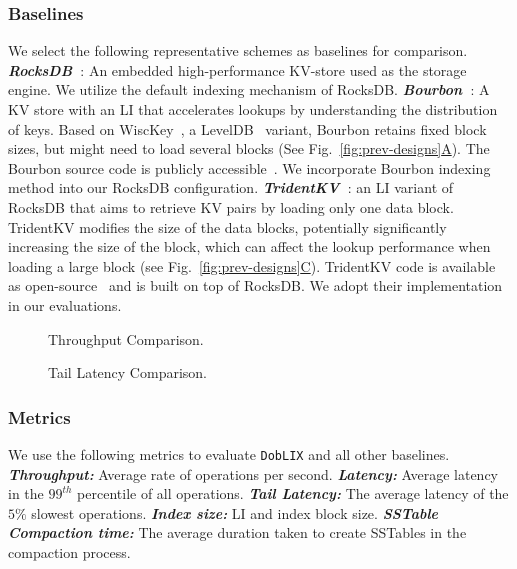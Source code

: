 \subsubsection{\textbf{Baselines}} We select the following representative schemes as baselines for comparison. \textbf{\textit{{RocksDB~\cite{rocksdbpaper}}}}: An embedded high-performance KV-store used as the storage engine. We utilize the default indexing mechanism of RocksDB.
\textbf{\textit{{Bourbon~\cite{Bourbon2020}}}}: A KV store with an LI that accelerates lookups by understanding the distribution of keys. Based on WiscKey~\cite{lu2017wisckey}, a LevelDB~\cite{leveldb} variant, Bourbon retains fixed block sizes, but might need to load several blocks (See Fig.~\hyperref[fig:prev-designs]{\ref*{fig:prev-designs}A}). The Bourbon source code is publicly accessible~\cite{BourbonGithub}. We incorporate Bourbon indexing method into our RocksDB configuration. \textbf{\textit{{TridentKV~\cite{TridentKV2022}}}}: an LI variant of RocksDB that aims to retrieve KV pairs by loading only one data block. TridentKV modifies the size of the data blocks, potentially significantly increasing the size of the block, which can affect the lookup performance when loading a large block (see Fig.~\hyperref[fig:prev-designs]{\ref*{fig:prev-designs}C}). TridentKV code is available as open-source~\cite{TridentKVGithub} and is built on top of RocksDB. We adopt their implementation in our evaluations.

\begin{figure*}
  \centering
  \vspace{-2em}
  \caption{\small{Throughput Comparison.}}
  \label{fig:eval-throughput}
  \vspace{-0.5em}
\end{figure*}

\begin{figure*}
  \centering
  \vspace{-2em}
  \caption{\small{Tail Latency Comparison.}}
  \label{fig:eval-latency}
  \vspace{-1em}
\end{figure*}

\noindent
\subsubsection{\textbf{Metrics}} We use the following metrics to evaluate \texttt{DobLIX} and all other baselines. \textbf{\textit{{Throughput:}}} Average rate of operations per second. \textbf{\textit{ {Latency:}}} Average latency in the $99^{th}$ percentile of all operations. \textbf{\textit{ {Tail Latency:}}}  The average latency of the $5\%$ slowest operations. \textbf{\textit{ {Index size:}}} LI and index block size. \textbf{\textit{{SSTable Compaction time:}}} The average duration taken to create SSTables in the compaction process.

